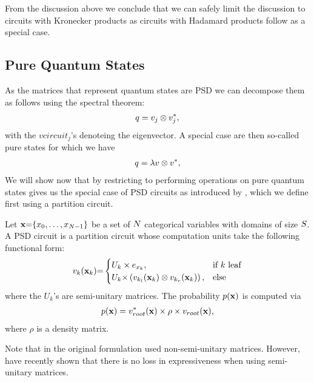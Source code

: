 From the discussion above we conclude that we can safely limit the discussion to circuits with Kronecker products as circuits with Hadamard products follow as a special case.



\subsection{Pure Quantum States}
\label{sec:purestate}

As the matrices that represent quantum states are PSD we can decompose them as follows using the spectral theorem:
\begin{align}
	q = v_j \otimes v_j^*,
\end{align}
with the $vcircuit_j$'s denoteing the eigenvector.
A special case are then so-called pure states for which we have
\begin{align}
	q = \lambda v \otimes v^*,
\end{align}
We will show now that by restricting \puncs to performing operations on pure quantum states gives us the special case of PSD circuits as introduced by \citet{sladek2023encoding}, which we define first using a partition circuit.
\begin{definition}
	\label{def:vpoc}
	Let   $\mathbf{x}{=}\{x_0,\dots ,x_{N{-}1}  \}$ be a set of $N$ categorical variables with domains of size $S$.
	A PSD circuit is a partition circuit whose computation units take the following functional form:
	\begin{align}
		{\ensuremath{v}}_k(\mathbf{x}_k){=}
		\begin{cases}
			U_{k} \times  e_{x_k},
			 & \text{if $k$ leaf}
			\\
			U_{k} {\times}  \left( v_{k_l}  (\mathbf{x}_k)  \otimes   v_{k_r} (\mathbf{x}_k) \right),
			 & \text{else}
		\end{cases}
		\label{eq:vector_units}
	\end{align}
	where the $U_k$'s are semi-unitary matrices.
	The probability $p(\mathbf{x})$ is computed via
	\begin{align}
		p(\mathbf{x}) = {v}^*_{root}(\mathbf{x}) \times  \rho \times {\ensuremath{v}}_{root}(\mathbf{x}),
	\end{align}
	where $\rho$ is a density matrix.
\end{definition}
Note that in the original formulation \citet{sladek2023encoding} used non-semi-unitary matrices. However, \citet{loconte2024faster} have recently shown that there is no loss in expressiveness when using semi-unitary matrices.

